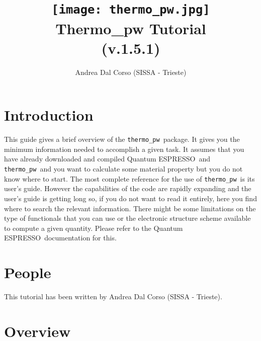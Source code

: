 \documentclass[12pt,a4paper]{article}
\def\version{1.5.1}
\def\qe{{\sc Quantum ESPRESSO}}
\def\thermo{\texttt{thermo\_pw}}
\begin{document}
 

\author{Andrea Dal Corso (SISSA - Trieste)}
\date{}

\title{
  \texttt{[image: thermo\_pw.jpg]} \\
  \vspace{3truecm}
  \Huge \color{blue} {\sc Thermo}\_{\sc pw} Tutorial \\ (v.\version)
}

\maketitle

\newpage

\tableofcontents

\newpage

\section{\color{coral}Introduction}

This guide gives a brief overview of the \thermo\ package. 
It gives you the minimum information needed to accomplish a given task.
It assumes that you have already downloaded and compiled \qe\ and \thermo\  
and you want to calculate some material property but you do not know where 
to start. 
The most complete reference for the use of \thermo\ is its user's guide.
However the capabilities of the code are rapidly expanding and the 
user's guide is getting long so, if you do not want
to read it entirely, here you find where to search the relevant information. 
There might be some limitations on the type of functionals that you can use 
or the electronic structure scheme available to compute a given quantity.
Please refer to the \qe\ documentation for this.

\newpage

\section{\color{coral}People}
This tutorial has been written by Andrea Dal Corso (SISSA - Trieste). 

\newpage

\section{\color{coral}Overview}
\end{document}
